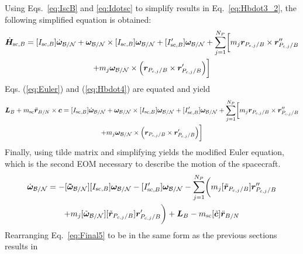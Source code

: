 \documentclass[]{BasiliskReportMemo}
\begin{document}
	Using Eqs.~\eqref{eq:IscB} and \eqref{eq:Idotsc} to simplify results in Eq.~\eqref{eq:Hbdot3_2}, the following simplified equation is obtained:
	\begin{multline}
	\dot{\bm{H}}_{\text{sc},B} = [I_{\text{sc},B}] \dot{\bm\omega}_{\cal B/N} + \bm\omega_{\cal B/N} \times [I_{\text{sc},B}] \bm\omega_{\cal B/N} + [I'_{\text{sc},B}] \bm\omega_{\cal B/N}
	+ \sum\limits_{j=1}^{N_P}\biggl[m_j \bm r_{P_{c,j}/B}\times\bm{r}''_{P_{c,j}/B} \\
	+ m_j \bm\omega_{\cal B/N} \times \Bigl(\bm{r}_{P_{c,j}/B} \times \bm{r}'_{P_{c,j}/B}\Bigr)\biggr]
	\label{eq:Hbdot4}
	\end{multline}
	Eqs. (\ref{eq:Euler}) and (\ref{eq:Hbdot4}) are equated and yield
	\begin{multline}
	\bm{L}_B+m_{\text{sc}}\ddot{\bm r}_{B/N}\times\bm{c} = [I_{\text{sc},B}] \dot{\bm\omega}_{\cal B/N} + \bm\omega_{\cal B/N} \times [I_{\text{sc},B}] \bm\omega_{\cal B/N} + [I'_{\text{sc},B}] \bm\omega_{\cal B/N}
	+ \sum\limits_{j=1}^{N_P}\biggl[m_j \bm r_{P_{c,j}/B}\times\bm{r}''_{P_{c,j}/B}\\
	 + m_j \bm\omega_{\cal B/N} \times \Bigl(\bm{r}_{P_{c,j}/B} \times \bm{r}'_{P_{c,j}/B}\Bigr)\biggr]
	\end{multline}
	Finally, using tilde matrix and simplifying yields the modified Euler equation, which is the second EOM necessary to describe the motion of the spacecraft.
	\begin{multline}
	[I_{\text{sc},B}] \dot{\bm\omega}_{\cal B/N} = -[\bm{\tilde{\omega}}_{\cal B/N}] [I_{\text{sc},B}] \bm\omega_{\cal B/N} - [I'_{\text{sc},B}] \bm\omega_{\cal B/N}	- \sum\limits_{j=1}^{N_P}\biggl(m_j [\tilde{\bm r}_{P_{c,j}/B}]\bm{r}''_{P_{c,j}/B}\\
	 + m_j [\tilde{\bm\omega}_{\cal B/N}] [\tilde{\bm{r}}_{P_{c,j}/B}] \bm{r}'_{P_{c,j}/B}\biggr) + \bm{L}_B - m_{\text{sc}} [\tilde{\bm{c}}] \ddot{\bm r}_{B/N}
	\label{eq:Final5}
	\end{multline}
	Rearranging Eq.~\eqref{eq:Final5} to be in the same form as the previous sections results in
\end{document}
